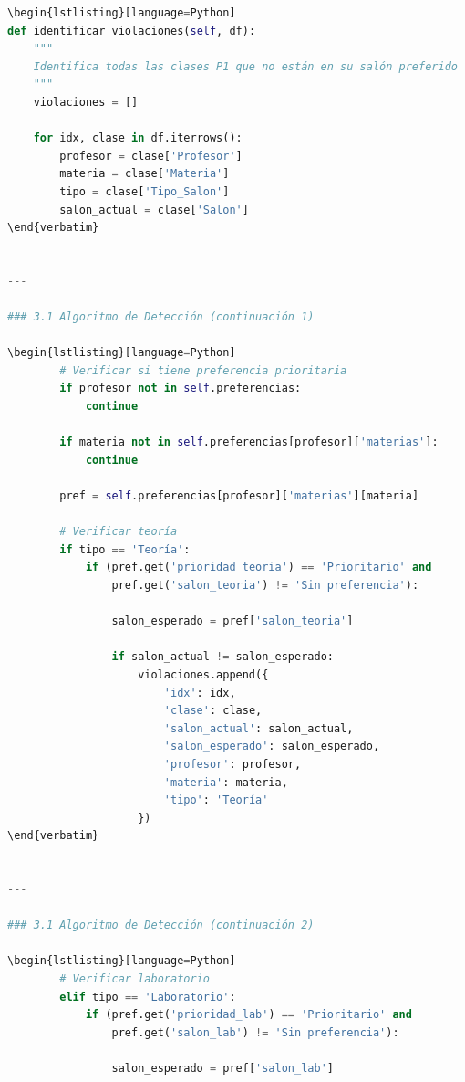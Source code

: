 \begin{itemize}
\begin{itemize}
\begin{itemize}
\begin{itemize}
\begin{itemize}
\begin{itemize}
\begin{enumerate}
\begin{enumerate}
\begin{enumerate}
\begin{enumerate}
\begin{lstlisting}[language=Python]
\begin{lstlisting}[language=Python]
def identificar_violaciones(self, df):
    """
    Identifica todas las clases P1 que no están en su salón preferido
    """
    violaciones = []
    
    for idx, clase in df.iterrows():
        profesor = clase['Profesor']
        materia = clase['Materia']
        tipo = clase['Tipo_Salon']
        salon_actual = clase['Salon']
\end{verbatim}


---

### 3.1 Algoritmo de Detección (continuación 1)

\begin{lstlisting}[language=Python]
        # Verificar si tiene preferencia prioritaria
        if profesor not in self.preferencias:
            continue
        
        if materia not in self.preferencias[profesor]['materias']:
            continue
        
        pref = self.preferencias[profesor]['materias'][materia]
        
        # Verificar teoría
        if tipo == 'Teoría':
            if (pref.get('prioridad_teoria') == 'Prioritario' and
                pref.get('salon_teoria') != 'Sin preferencia'):
                
                salon_esperado = pref['salon_teoria']
                
                if salon_actual != salon_esperado:
                    violaciones.append({
                        'idx': idx,
                        'clase': clase,
                        'salon_actual': salon_actual,
                        'salon_esperado': salon_esperado,
                        'profesor': profesor,
                        'materia': materia,
                        'tipo': 'Teoría'
                    })
\end{verbatim}


---

### 3.1 Algoritmo de Detección (continuación 2)

\begin{lstlisting}[language=Python]
        # Verificar laboratorio
        elif tipo == 'Laboratorio':
            if (pref.get('prioridad_lab') == 'Prioritario' and
                pref.get('salon_lab') != 'Sin preferencia'):
                
                salon_esperado = pref['salon_lab']
                

\end{lstlisting}
\end{enumerate}
\end{enumerate}
\end{enumerate}
\end{enumerate}
\end{itemize}
\end{itemize}
\end{itemize}
\end{itemize}
\end{itemize}
\end{itemize}
